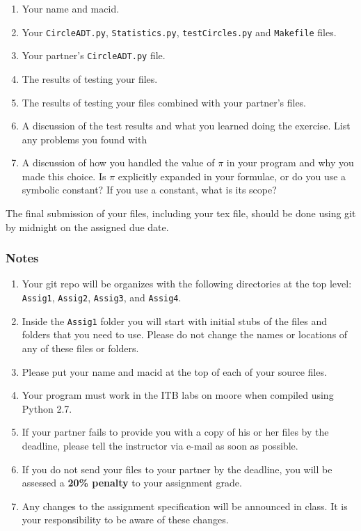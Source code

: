 \documentclass[12pt]{article}
\begin{document}
\begin{enumerate}
\item Your name and macid.
\item Your {\tt CircleADT.py}, {\tt Statistics.py}, {\tt testCircles.py} and {\tt Makefile} files.
\item Your partner's {\tt CircleADT.py} file.
\item The results of testing your files.
\item The results of testing your files combined with your partner's files.
\item A discussion of the test results and what you learned doing the exercise.
  List any problems you found with
\item A discussion of how you handled the value of $\pi$ in your program and why
  you made this choice.  Is $\pi$ explicitly expanded in your formulae, or do
  you use a symbolic constant?  If you use a constant, what is its scope?
\end{enumerate}

The final submission of your files, including your tex file, should be done
using git by midnight on the assigned due date.

\subsubsection*{Notes}

\begin{enumerate}
\item Your git repo will be organizes with the following directories at the
  top level: {\tt Assig1}, {\tt Assig2}, {\tt Assig3}, and {\tt Assig4}. 
\item Inside the {\tt Assig1} folder you will start with initial stubs of the
  files and folders that you need to use.  Please do not change the names or
  locations of any of these files or folders.  
\item Please put your name and macid at the top of each of your source
  files.
\item Your program must work in the ITB labs on moore when compiled using Python
  2.7.  
\item If your partner fails to provide you with a copy of his or her files by
  the deadline, please tell the instructor via e-mail as soon as possible.
\item If you do not send your files to your partner by the deadline, you will be
  assessed a \textbf{20\% penalty} to your assignment grade.
\item Any changes to the assignment specification will be announced in class.
  It is your responsibility to be aware of these changes.
\end{enumerate}
\end{document}

